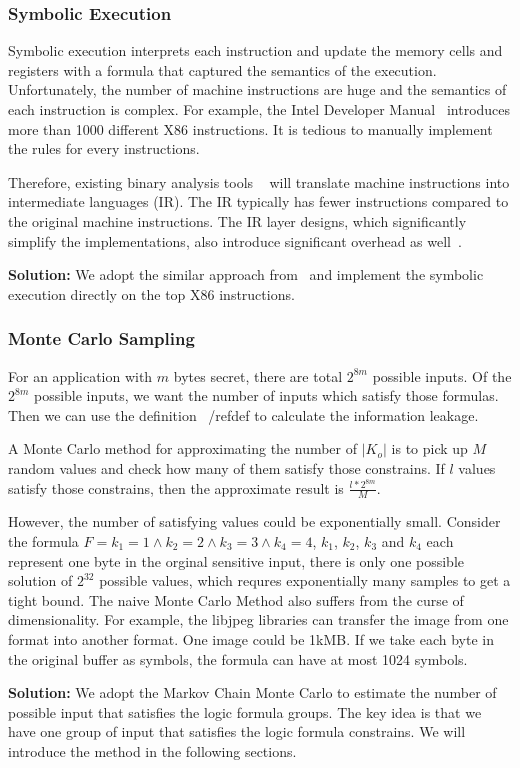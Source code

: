 \subsubsection{Symbolic Execution}
Symbolic execution interprets each instruction and update the memory cells and registers with a 
formula that captured the semantics of the execution. Unfortunately, the number of machine instructions 
are huge and the semantics of each instruction is complex. For example, the Intel Developer Manual~\cite{intelsys}
introduces more than 1000 different X86 instructions. It is tedious to manually implement the
rules for every instructions.

Therefore, existing binary analysis tools ~\cite{shoshitaishvili2016state, 10.1007/978-3-642-22110-1_37} 
will translate machine instructions into intermediate languages (IR). The IR typically has fewer 
instructions compared to the original machine instructions. The IR layer designs, which significantly
simplify the implementations, also introduce significant overhead as well~\cite{217563}.

\textbf{Solution: }We adopt the similar approach from~\cite{217563} and implement the symbolic execution 
directly on the top X86 instructions.

\subsubsection{Monte Carlo Sampling}
\label{MCreasons}
For an application with $m$ bytes secret, there are total $2^{8m}$ possible inputs. Of the
$2^{8m}$ possible inputs, we want the number of inputs which satisfy those formulas.
Then we can use the definition ~/ref{def} to calculate the information leakage.

A Monte Carlo method for approximating the number of $|K_o|$ is to pick up 
$M$ random values and check how many of them satisfy those constrains. If $l$ values
satisfy those constrains, then the approximate result is $\frac{l*2^{8m}}{M}$.

However, the number of satisfying values could be exponentially small. Consider the formula
$F={k_1} = 1\land{k_2} = 2\land{k_3} = 3\land{k_4} = 4$, $k_1$, $k_2$, $k_3$ and $k_4$ each represent
one byte in the orginal sensitive input, there is only one possible solution of $2^{32}$ possible
values, which requres exponentially many samples to get a tight bound. 
The naive Monte Carlo Method also suffers from the curse of dimensionality. For example, 
the libjpeg libraries can transfer the image from one format into another format. One image could
be 1kMB. If we take each byte in the original buffer as symbols, the formula can have at most
1024 symbols. 

\textbf{Solution: }We adopt the Markov Chain Monte Carlo to estimate the number of possible input
that satisfies the logic formula groups. The key idea is that we have one group of input that satisfies
the logic formula constrains.  We will
introduce the method in the following sections.
